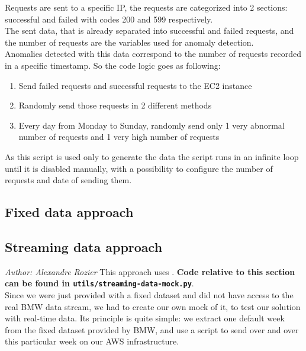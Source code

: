         Requests are sent to a specific IP, the requests are categorized into 2 sections: successful and failed with codes 200 and 599 respectively.\\
        The sent data, that is already separated into successful and failed requests, and the number of requests are the variables used for anomaly detection.\\
        Anomalies detected with this data correspond to the number of requests recorded in a specific timestamp. So the code logic goes as following:
        \begin{enumerate}
    \item Send failed requests and successful requests to the EC2 instance
    \item Randomly send those requests in 2 different methods
    \item Every day from Monday to Sunday, randomly send only 1 very abnormal number of requests and 1 very high number of requests
\end{enumerate}
  
        As this script is used only to generate the data the script runs in an infinite loop until it is disabled manually, with a possibility to configure the number of requests and date of sending them.\\


\subsection{Fixed data approach}\label{fixed-data-approach}
    
    
\subsection{Streaming data approach}
\textit{Author: Alexandre Rozier} 
\label{sec:streaming-data-approach}
    This approach uses  \label{ec2script}.
    \textbf{Code relative to this section can be found in \lstinline{utils/streaming-data-mock.py}}. \\
    Since we were just provided with a fixed dataset and did not have access to the real BMW data stream, we had to create our own mock of it, to test our solution with real-time data. Its principle is quite simple: we extract one default week from the fixed dataset provided by BMW, and use a script to send over and over this particular week on our AWS infrastructure. \par
    
